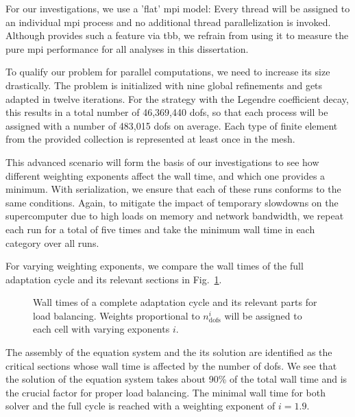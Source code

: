 For our investigations, we use a 'flat' \gls{mpi} model: Every thread will be assigned to an individual \gls{mpi} process and no additional thread parallelization is invoked. Although \dealii{} provides such a feature via \gls{tbb}, we refrain from using it to measure the pure \gls{mpi} performance for all analyses in this dissertation.


To qualify our problem for parallel computations, we need to increase its size drastically. The problem is initialized with nine global refinements and gets adapted in twelve iterations. For the strategy with the Legendre coefficient decay, this results in a total number of 46,369,440 \glspl{dof}, so that each process will be assigned with a number of 483,015 \glspl{dof} on average. Each type of finite element from the provided collection is represented at least once in the mesh.

This advanced scenario will form the basis of our investigations to see how different weighting exponents affect the wall time, and which one provides a minimum. With serialization, we ensure that each of these runs conforms to the same conditions. Again, to mitigate the impact of temporary slowdowns on the supercomputer due to high loads on memory and network bandwidth, we repeat each run for a total of five times and take the minimum wall time in each category over all runs.


For varying weighting exponents, we compare the wall times of the full adaptation cycle and its relevant sections
in Fig.~\ref{fig:weights}.

\begin{figure}
\centering

\caption[Wall times for load balancing with varying weighting exponents.]{Wall times of a complete adaptation cycle and its relevant parts for load balancing. Weights proportional to $n_\text{dofs}^i$ will be assigned to each cell with varying exponents $i$.}
\label{fig:weights}
\end{figure}

The assembly of the equation system and the its solution are identified as the critical sections whose wall time is affected by the number of \glspl{dof}. We see that the solution of the equation system takes about 90\% of the total wall time and is the crucial factor for proper load balancing. The minimal wall time for both solver and the full cycle is reached with a weighting exponent of $i = 1.9$.

